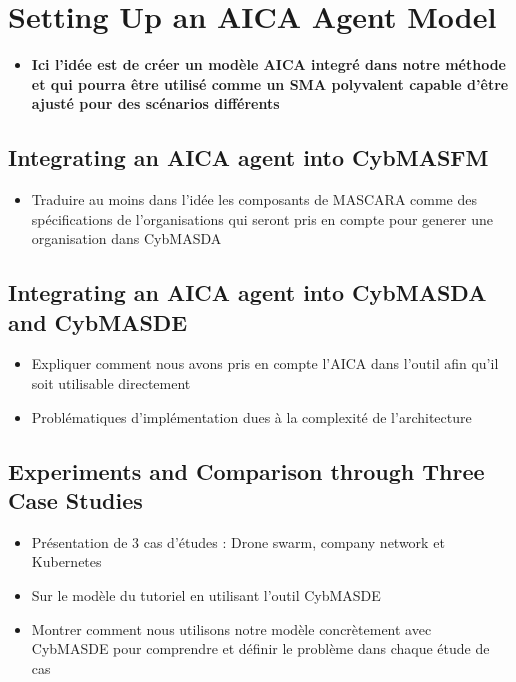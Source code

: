 \chapter{Setting Up an AICA Agent Model}\label{ch:aica_model} %

\begin{itemize}
    \item \textbf{Ici l'idée est de créer un modèle AICA integré dans notre méthode et qui pourra être utilisé comme un SMA polyvalent capable d'être ajusté pour des scénarios différents}
\end{itemize}

\section{Integrating an AICA agent into CybMASFM}
\begin{itemize}

    \item Traduire au moins dans l'idée les composants de MASCARA comme des spécifications de l'organisations qui seront pris en compte pour generer une organisation dans CybMASDA
\end{itemize}

\section{Integrating an AICA agent into CybMASDA and CybMASDE}
\begin{itemize}
    \item Expliquer comment nous avons pris en compte l'AICA dans l'outil afin qu'il soit utilisable directement
    \item Problématiques d'implémentation dues à la complexité de l'architecture
\end{itemize}


\section{Experiments and Comparison through Three Case Studies}
\begin{itemize}
    \item Présentation de 3 cas d’études : Drone swarm, company network et Kubernetes
    \item Sur le modèle du tutoriel en utilisant l'outil CybMASDE
    \item Montrer comment nous utilisons notre modèle concrètement avec CybMASDE pour comprendre et définir le problème dans chaque étude de cas
\end{itemize}

